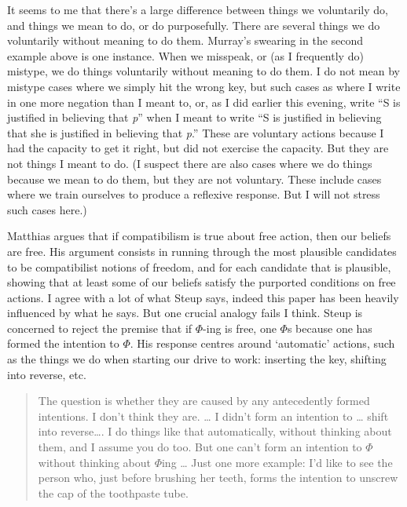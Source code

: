 It seems to me that there's a large difference between things we voluntarily do, and things we mean to do, or do purposefully. There are several things we do voluntarily without meaning to do them. Murray's swearing in the second example above is one instance. When we misspeak, or (as I frequently do) mistype, we do things voluntarily without meaning to do them. I do not mean by mistype cases where we simply hit the wrong key, but such cases as where I write in one more negation than I meant to, or, as I did earlier this evening, write ``S is justified in believing that \textit{p}'' when I meant to write ``S is justified in believing that she is justified in believing that \textit{p}.'' These are voluntary actions because I had the capacity to get it right, but did not exercise the capacity. But they are not things I meant to do. (I suspect there are also cases where we do things because we mean to do them, but they are not voluntary. These include cases where we train ourselves to produce a reflexive response. But I will not stress such cases here.)

Matthias \citet{Steup2008} argues that if compatibilism is true about free action, then our beliefs are free. His argument consists in running through the most plausible candidates to be compatibilist notions of freedom, and for each candidate that is plausible, showing that at least some of our beliefs satisfy the purported conditions on free actions. I agree with a lot of what Steup says, indeed this paper has been heavily influenced by what he says. But one crucial analogy fails I think. Steup is concerned to reject the premise that if $\Phi $-ing is free, one $\Phi $s because one has formed the intention to $\Phi $. His response centres around `automatic' actions, such as the things we do when starting our drive to work: inserting the key, shifting into reverse, etc. 

\begin{quote}The question is whether they are caused by any antecedently formed intentions. I don't think they are. {\dots} I didn't form an intention to {\dots} shift into reverse{\dots}. I do things like that automatically, without thinking about them, and I assume you do too. But one can't form an intention to $\Phi $ without thinking about $\Phi $ing {\dots} Just one more example: I'd like to see the person who, just before brushing her teeth, forms the intention to unscrew the cap of the toothpaste tube. \cite[383]{Steup2008}
\end{quote}

